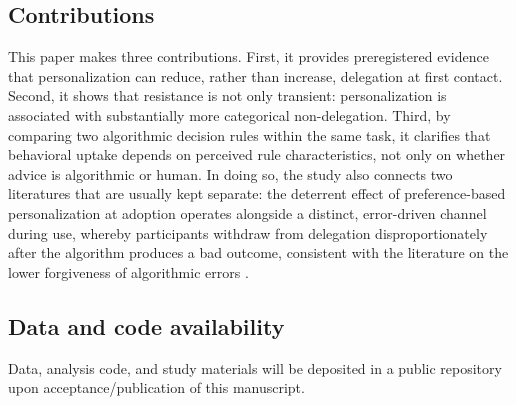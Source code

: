 \documentclass[a4paper, 12pt, fleqn]{article}
\theoremstyle{definition}
\begin{document}
\subsection{Contributions}
This paper makes three contributions. First, it provides preregistered evidence that personalization can reduce, rather than increase, delegation at first contact. Second, it shows that resistance is not only transient: personalization is associated with substantially more categorical non-delegation. Third, by comparing two algorithmic decision rules within the same task, it clarifies that behavioral uptake depends on perceived rule characteristics, not only on whether advice is algorithmic or human. In doing so, the study also connects two literatures that are usually kept separate: the deterrent effect of preference-based personalization at adoption operates alongside a distinct, error-driven channel during use, whereby participants withdraw from delegation disproportionately after the algorithm produces a bad outcome, consistent with the literature on the lower forgiveness of algorithmic errors \citep{Dietvorst2018,Renier2021}.

\subsection{Data and code availability}
Data, analysis code, and study materials will be deposited in a public repository upon acceptance/publication of this manuscript. %
\end{document}
